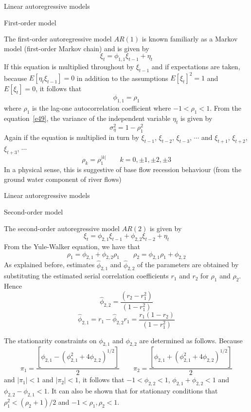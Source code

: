 \documentclass[8pt]{beamer}
\renewcommand{\emph}[1]{\textcolor{myorange}{#1}}
\begin{document}
 \begin{frame}{Linear autoregressive models}
     \begin{block}{First-order model}
    \end{block}
    The \alert{first-order autoregressive model $AR(1)$} is known familiarly as a \alert{Markov model} (\alert{first-order Markov chain}) and is given by
    \[
        \xi_t = \phi_{1,1} \xi_{t-1} + \eta_t
    \]
    If this equation is multiplied throughout by $\xi_{t-1}$ and if expectations are taken, because $E[\eta_t \xi_{t-1}]= 0$ in addition to the assumptions $E[\xi_t]^2= 1$ and $E[\xi_t] =0$, it follows that 
    \[
        \phi_{1,1} = \rho_1
    \]
    where $\rho_1$ is the \emph{lag-one autocorrelation coefficient} where $-1<\rho_1 < 1$. From the equation~\ref{e49}, the \emph{variance of the independent variable} $\eta_t$ is given by
    \[
        \sigma_{\eta}^2 = 1-\rho_1^2
    \]
    Again if the equation is multiplied in turn by $\xi_{t-1}$, $\xi_{t-2}$, $\xi_{t-3}$, $\cdots$ and $\xi_{t+1}$, $\xi_{t+2}$, $\xi_{t+3}$, $\cdots$
    \[
        \rho_k = \rho_1^{|k|} \quad \quad k=0,\pm 1, \pm 2, \pm 3
    \]
In a physical sense, this is suggestive of \emph{base flow recession} behaviour (from the ground water component of river flows)
\end{frame}

 \begin{frame}{Linear autoregressive models}
     \begin{block}{Second-order model}
    \end{block}
    The \alert{second-order autoregressive model $AR(2)$} is given by
    \[
        \xi_t = \phi_{2,1} \xi_{t-1} + \phi_{2,2} \xi_{t-2} + \eta_t
    \]
    From the \emph{Yule-Walker} equation, we have that
    \[
        \rho_1 = \phi_{2,1} + \phi_{2,2}\rho_1 \quad \quad \rho_2 = \phi_{2,1}\rho_1 + \phi_{2,2}
    \]
    As explained before, estimates $\hat{\phi}_{2,1}$ and $\hat{\phi}_{2,2}$ of the parameters are obtained by substituting the estimated \emph{serial correlation coefficients} $r_1$ and $r_2$ for $\rho_1$ and $\rho_2$. Hence
    \begin{equation}
        \hat{\phi}_{2,2} = \frac{(r_2 - r_1^2)}{(1-r_1^2)} 
        \label{e416}
    \end{equation}
    \begin{equation}
        \hat{\phi}_{2,1} = r_1 - \hat{\phi}_{2,2} r_1 = \frac{r_1 (1-r_2)}{(1-r_1^2)}
        \label{e417}
    \end{equation}

    The \emph{stationarity} constraints on $\phi_{2,1}$ and $\phi_{2,2}$ are determined as follows. Because 
    \[
        \pi_1 = \frac{\left[ \phi_{2,1} - (\phi_{2,1}^2 + 4\phi_{2,2})^{1/2} \right]}{2} \quad \quad     \pi_2 = \frac{\left[ \phi_{2,1} + (\phi_{2,1}^2 + 4\phi_{2,2})^{1/2} \right]}{2}
    \]
    and $|\pi_1|<1$ and $|\pi_2|<1$, it follows that $-1 < \phi_{2,2} < 1$, $\phi_{2,1} + \phi_{2,2} < 1$ and $\phi_{2,2}-\phi_{2,1} <1$. It can also be shown that for \emph{stationary} conditions that $\rho_1^2 <(\rho_2 +1)/2$ and $-1< \rho_1, \rho_2 <1$. 

\end{frame}
  
\end{document}
